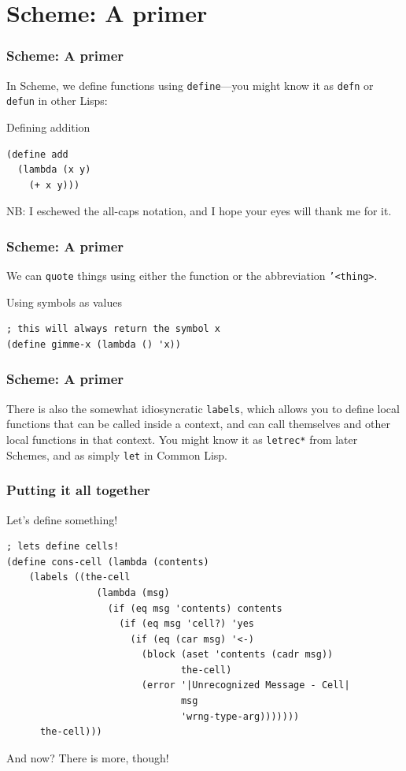 \documentclass[aspectratio=169]{beamer}
\begin{document}
  \section{Scheme: A primer}
  \begin{frame}[fragile]
    \frametitle{Scheme: A primer}
    In Scheme, we define functions using \texttt{define}—you might know it as
    \texttt{defn} or \texttt{defun} in other Lisps:

    \begin{listing}[H]
      \caption{Defining addition}
      \begin{verbatim}
(define add
  (lambda (x y)
    (+ x y)))
      \end{verbatim}
    \end{listing}

    NB: I eschewed the all-caps notation, and I hope your eyes will thank me
    for it.
  \end{frame}
  \begin{frame}[fragile]
    \frametitle{Scheme: A primer}
    We can \texttt{quote} things using either the function or the abbreviation
    \texttt{'<thing>}.

    \begin{listing}[H]
      \caption{Using symbols as values}
      \begin{verbatim}
; this will always return the symbol x
(define gimme-x (lambda () 'x))
      \end{verbatim}
    \end{listing}
  \end{frame}
  \begin{frame}[fragile]
    \frametitle{Scheme: A primer}
    There is also the somewhat idiosyncratic \texttt{labels}, which allows you
    to define local functions that can be called inside a context, and can call
    themselves and other local functions in that context. You might know it as
    \texttt{letrec*} from later Schemes, and as simply \texttt{let} in Common
    Lisp.
  \end{frame}
  \begin{frame}[fragile]
    \frametitle{Putting it all together}
    \begin{listing}[H]
      \caption{Let’s define something!}
      \begin{verbatim}
; lets define cells!
(define cons-cell (lambda (contents)
    (labels ((the-cell
                (lambda (msg)
                  (if (eq msg 'contents) contents
                    (if (eq msg 'cell?) 'yes
                      (if (eq (car msg) '<-)
                        (block (aset 'contents (cadr msg))
                               the-cell)
                        (error '|Unrecognized Message - Cell|
                               msg
                               'wrng-type-arg)))))))
      the-cell)))
      \end{verbatim}
    \end{listing}
  \end{frame}
  \begin{frame}{And now?}
    There is more, though!
  \end{frame}
\end{document}
